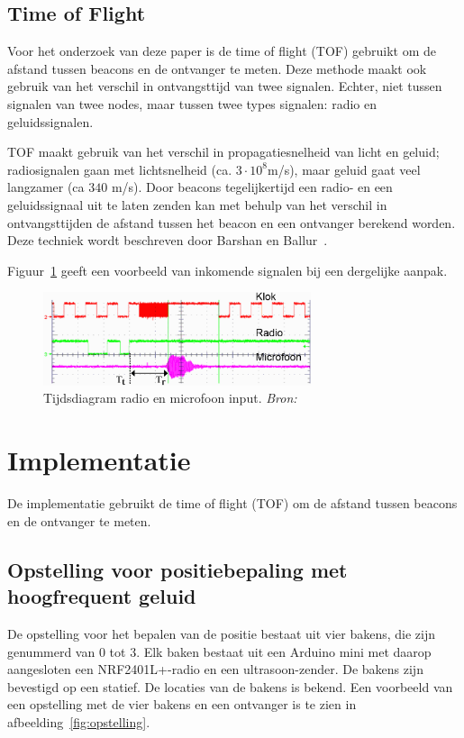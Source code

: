 \documentclass[a4paper,10pt]{article}
\begin{document}
\subsection{Time of Flight}\label{sec:tof}
Voor het onderzoek van deze paper is de time of flight (TOF) gebruikt om de afstand tussen beacons en de ontvanger te meten. Deze methode maakt ook gebruik van het verschil in ontvangsttijd van twee signalen. Echter, niet tussen signalen van twee nodes, maar tussen twee types signalen: radio en geluidssignalen.

TOF maakt gebruik van het verschil in propagatiesnelheid van licht en geluid; radiosignalen gaan met lichtsnelheid (ca. $3\cdot 10^{8}$m/s), maar geluid gaat veel langzamer (ca $340$ m/s). Door beacons tegelijkertijd een radio- en een geluidssignaal uit te laten zenden kan met behulp van het verschil in ontvangsttijden de afstand tussen het beacon en een ontvanger berekend worden. Deze techniek wordt beschreven door Barshan en Ballur~\cite{barshan2000fast}.

Figuur~\ref{fig:tijdsdiagram} geeft een voorbeeld van inkomende signalen bij een dergelijke aanpak.
\begin{figure}[ht!]
    \centering
    \includegraphics[width=0.7\textwidth]{tijdsdiagram.png}
    \caption{Tijdsdiagram radio en microfoon input. \textit{Bron: \cite{park2011beacon}}}
    \label{fig:tijdsdiagram}
\end{figure}

\section{Implementatie}\label{sec:implementatie}
De implementatie gebruikt de time of flight (TOF) om de afstand tussen beacons en de ontvanger te meten.

\subsection{Opstelling voor positiebepaling met hoogfrequent geluid}
De opstelling voor het bepalen van de positie bestaat uit vier bakens, die zijn genummerd van 0 tot 3. Elk baken bestaat uit een Arduino mini met daarop aangesloten een NRF2401L+-radio en een ultrasoon-zender. De bakens zijn bevestigd op een statief. De locaties van de bakens is bekend. Een voorbeeld van een opstelling met de vier bakens en een ontvanger is te zien in afbeelding~\ref{fig:opstelling}.
\end{document}
